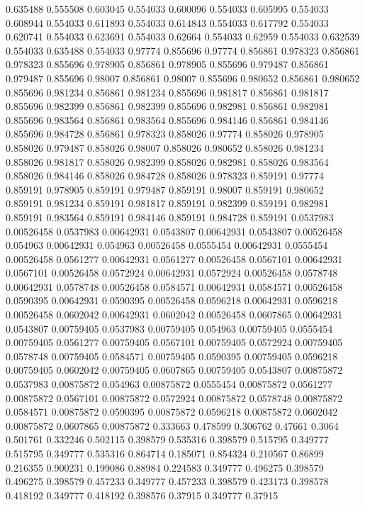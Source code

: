 0.635488 0.555508
0.603045 0.554033
0.600096 0.554033
0.605995 0.554033
0.608944 0.554033
0.611893 0.554033
0.614843 0.554033
0.617792 0.554033
0.620741 0.554033
0.623691 0.554033
0.62664 0.554033
0.62959 0.554033
0.632539 0.554033
0.635488 0.554033
0.97774 0.855696
0.97774 0.856861
0.978323 0.856861
0.978323 0.855696
0.978905 0.856861
0.978905 0.855696
0.979487 0.856861
0.979487 0.855696
0.98007 0.856861
0.98007 0.855696
0.980652 0.856861
0.980652 0.855696
0.981234 0.856861
0.981234 0.855696
0.981817 0.856861
0.981817 0.855696
0.982399 0.856861
0.982399 0.855696
0.982981 0.856861
0.982981 0.855696
0.983564 0.856861
0.983564 0.855696
0.984146 0.856861
0.984146 0.855696
0.984728 0.856861
0.978323 0.858026
0.97774 0.858026
0.978905 0.858026
0.979487 0.858026
0.98007 0.858026
0.980652 0.858026
0.981234 0.858026
0.981817 0.858026
0.982399 0.858026
0.982981 0.858026
0.983564 0.858026
0.984146 0.858026
0.984728 0.858026
0.978323 0.859191
0.97774 0.859191
0.978905 0.859191
0.979487 0.859191
0.98007 0.859191
0.980652 0.859191
0.981234 0.859191
0.981817 0.859191
0.982399 0.859191
0.982981 0.859191
0.983564 0.859191
0.984146 0.859191
0.984728 0.859191
0.0537983 0.00526458
0.0537983 0.00642931
0.0543807 0.00642931
0.0543807 0.00526458
0.054963 0.00642931
0.054963 0.00526458
0.0555454 0.00642931
0.0555454 0.00526458
0.0561277 0.00642931
0.0561277 0.00526458
0.0567101 0.00642931
0.0567101 0.00526458
0.0572924 0.00642931
0.0572924 0.00526458
0.0578748 0.00642931
0.0578748 0.00526458
0.0584571 0.00642931
0.0584571 0.00526458
0.0590395 0.00642931
0.0590395 0.00526458
0.0596218 0.00642931
0.0596218 0.00526458
0.0602042 0.00642931
0.0602042 0.00526458
0.0607865 0.00642931
0.0543807 0.00759405
0.0537983 0.00759405
0.054963 0.00759405
0.0555454 0.00759405
0.0561277 0.00759405
0.0567101 0.00759405
0.0572924 0.00759405
0.0578748 0.00759405
0.0584571 0.00759405
0.0590395 0.00759405
0.0596218 0.00759405
0.0602042 0.00759405
0.0607865 0.00759405
0.0543807 0.00875872
0.0537983 0.00875872
0.054963 0.00875872
0.0555454 0.00875872
0.0561277 0.00875872
0.0567101 0.00875872
0.0572924 0.00875872
0.0578748 0.00875872
0.0584571 0.00875872
0.0590395 0.00875872
0.0596218 0.00875872
0.0602042 0.00875872
0.0607865 0.00875872
0.333663 0.478599
0.306762 0.47661
0.3064 0.501761
0.332246 0.502115
0.398579 0.535316
0.398579 0.515795
0.349777 0.515795
0.349777 0.535316
0.864714 0.185071
0.854324 0.210567
0.86899 0.216355
0.900231 0.199086
0.88984 0.224583
0.349777 0.496275
0.398579 0.496275
0.398579 0.457233
0.349777 0.457233
0.398579 0.423173
0.398578 0.418192
0.349777 0.418192
0.398576 0.37915
0.349777 0.37915

